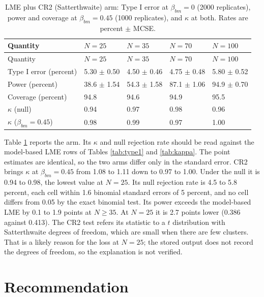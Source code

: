 \documentclass[
  11pt,
]{article}
\begin{document}
\begin{longtable}[]{@{}lllll@{}}
\caption{\label{tab:cr2} LME plus CR2 (Satterthwaite) arm: Type I error at \(\beta_{bm} = 0\) (2000 replicates), power and coverage at \(\beta_{bm} = 0.45\) (1000 replicates), and \(\kappa\) at both. Rates are percent \(\pm\) MCSE.}\tabularnewline
\toprule\noalign{}
Quantity & \(N = 25\) & \(N = 35\) & \(N = 70\) & \(N = 100\) \\
\midrule\noalign{}
\endfirsthead
\toprule\noalign{}
Quantity & \(N = 25\) & \(N = 35\) & \(N = 70\) & \(N = 100\) \\
\midrule\noalign{}
\endhead
\bottomrule\noalign{}
\endlastfoot
Type I error (percent) & 5.30 \(\pm\) 0.50 & 4.50 \(\pm\) 0.46 & 4.75 \(\pm\) 0.48 & 5.80 \(\pm\) 0.52 \\
Power (percent) & 38.6 \(\pm\) 1.54 & 54.3 \(\pm\) 1.58 & 87.1 \(\pm\) 1.06 & 94.9 \(\pm\) 0.70 \\
Coverage (percent) & 94.8 & 94.6 & 94.9 & 95.5 \\
\(\kappa\) (null) & 0.94 & 0.97 & 0.98 & 0.96 \\
\(\kappa\) (\(\beta_{bm} = 0.45\)) & 0.98 & 0.99 & 0.97 & 1.00 \\
\end{longtable}

Table \ref{tab:cr2} reports the arm. Its \(\kappa\) and null
rejection rate should be read against the model-based LME rows of
Tables \ref{tab:type1} and \ref{tab:kappa}. The point estimates
are identical, so the two arms differ only in the standard error.
CR2 brings \(\kappa\) at \(\beta_{bm} = 0.45\) from
1.08 to 1.11 down to
0.97 to 1.00. Under the null it is
0.94 to 0.98, the lowest value at \(N = 25\).
Its null rejection rate is 4.5 to 5.8 percent,
each cell within
1.6 binomial standard
errors of 5 percent, and no cell differs from 0.05 by the exact
binomial test. Its power exceeds the model-based LME by
0.1 to 1.9 points at
\(N \ge 35\). At \(N = 25\) it is
2.7 points lower
(0.386 against 0.413). The
CR2 test refers its statistic to a \(t\) distribution with
Satterthwaite degrees of freedom, which are small when there are few
clusters. That is a likely reason for the loss at \(N = 25\); the
stored output does not record the degrees of freedom, so the
explanation is not verified.

\section{Recommendation}\label{sec-recommendation}
\end{document}

